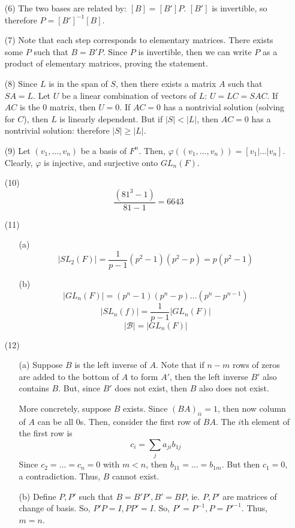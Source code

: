 \documentclass[12pt]{article}
\begin{document}
\begin{itemize}
\begin{itemize}
\end{itemize}
\item[(6)]
The two bases are related by: $[B] = [B']P$. $[B']$ is invertible, so therefore $P = [B']^{-1}[B]$.
\item[(7)]
Note that each step corresponds to elementary matrices. There exists some $P$ such that $B = B'P$. Since $P$ is invertible, then we can write $P$ as a product of elementary matrices, proving the statement.
\item[(8)]
Since $L$ is in the span of $S$, then there exists a matrix $A$ such that $SA = L$. Let $U$ be a linear combination of vectors of $L$: $U = LC = SAC$. If $AC$ is the 0 matrix, then $U = 0$. If $AC = 0$ has a nontrivial solution (solving for $C$), then $L$ is linearly dependent. But if $|S| < |L|$, then $AC = 0$ has a nontrivial solution: therefore $|S| \geq |L|$.
\item[(9)]
Let $(v_1, ..., v_n)$ be a basis of $F^n$. Then, $\varphi((v_1, ..., v_n)) = [v_1 | ... | v_n]$. Clearly, $\varphi$ is injective, and surjective onto $GL_n(F)$.
\item[(10)]
$$\frac{(81^3 - 1)}{81 - 1} = 6643$$
\item[(11)]
\begin{itemize}
\item[(a)]
$$|SL_2(F)| = \frac{1}{p - 1}(p^2 - 1)(p^2 - p) = p(p^2 - 1)$$
\item[(b)]
$$|GL_n(F)| = (p^n - 1)(p^n - p)...(p^n - p^{n - 1})$$
$$|SL_n(f)| = \frac{1}{p - 1}|GL_n(F)|$$
$$|\mathcal{B}| = |GL_n(F)|$$
\end{itemize}
\item[(12)]
\begin{itemize}
\item[(a)]
Suppose $B$ is the left inverse of $A$. Note that if $n - m$ rows of zeros are added to the bottom of $A$ to form $A'$, then the left inverse $B'$ also contains $B$. But, since $B'$ does not exist, then $B$ also does not exist.

More concretely, suppose $B$ exists. Since $(BA)_{ii} = 1$, then now column of $A$ can be all 0s. Then, consider the first row of $BA$. The $i$th element of the first row is 
$$c_i = \sum_{j} a_{ji}b_{1j}$$
Since $c_2 = ... = c_n = 0$ with $m < n$, then $b_{11} = ... = b_{1m}$. But then $c_1 = 0$, a contradiction. Thus, $B$ cannot exist.
\item[(b)]
Define $P, P'$ such that $B = B'P', B' = BP$, ie. $P, P'$ are matrices of change of basis. So, $P'P = I, PP' = I$. So, $P' = P^{-1}, P = P'^{-1}$. Thus, $m = n$.
\end{itemize}
\end{itemize}
\end{document}
